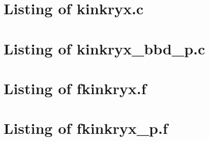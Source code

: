 
\newpage
\section{Listing of kinkryx.c}\label{s:kinkryx_c}

\newpage
\section{Listing of kinkryx\_bbd\_p.c}\label{s:kinkryx_bbd_p_c}


\newpage
\section{Listing of fkinkryx.f}\label{s:fkinkryx_f}

\newpage
\section{Listing of fkinkryx\_p.f}\label{s:fkinkryx_p_f}


